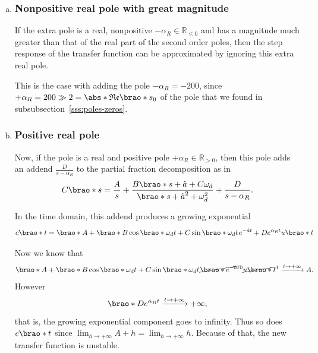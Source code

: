 \documentclass[12pt]{article}
\DeclarePairedDelimiter\brao()%
\DeclarePairedDelimiter\abs||
\begin{document}
\begin{enumerate}[(a)]
    \item
        \subsubsection{Nonpositive real pole with great magnitude}

        If the extra pole is a real, nonpositive $-\alpha_{{R}} \in \mathbb{R}_{\leq 0}$ and has a magnitude much greater than that of the real part of the second order poles,
        then the step response of the transfer function can be approximated by ignoring this extra real pole.

        This is the case with adding the pole $-\alpha_R = -200$, since $+\alpha_R = 200 \gg 2 = \abs*{\mathfrak{Re}\brao*{s_0}}$ of the pole that we found in subsubsection~\ref{sss:poles-zeros}.

    \item
        \subsubsection{Positive real pole}

        Now, if the pole is a real and positive pole $+\alpha_R \in \mathbb{R}_{> 0}$, then this pole adds an addend $\frac{D}{s - \alpha_R}$ to the partial fraction decomposition as in
        \begin{equation}
            C\brao*s = \frac{A}s + \frac{B\brao*{s + \hat{a}}+ C\omega_d}{\brao*{s + \hat{a}}^2 + \omega_d^2} + \frac{D}{s - \alpha_R}.
        \end{equation}

        In the time domain, this addend produces a growing exponential
        \begin{equation}
            c\brao*t = \brao*{
                A + \brao*{
                      B\cos\brao*{\omega_d t}
                    + C\sin\brao*{\omega_d t}^{\vphantom{1}}
                }^{\vphantom{1}}
                e^{-\hat{a}t}
                + De^{\alpha_Rt}
            }u\brao*t
        \end{equation}

        Now we know that
        \begin{equation}
            \brao*{
                A + \brao*{
                      B\cos\brao*{\omega_d t}
                    + C\sin\brao*{\omega_d t}^{\vphantom{1}}
                }^{\vphantom{1}}
                \cancel{\brao*{e^{-\hat{a}t}}}^0
            }\cancel{u\brao*t}^1
            \xrightarrow{t\to+\infty} A.
        \end{equation}
        However
        \begin{equation}
            \brao*{
                De^{\alpha_Rt}
            }
            \xrightarrow{t\to+\infty} +\infty,
        \end{equation}
        that is, the growing exponential component goes to infinity. Thus so does $c\brao*t$ since $\lim_{h\to+\infty} A + h = \lim_{h\to+\infty} h$.
        Because of that, the new transfer function is unstable.
\end{enumerate}
\end{document}

